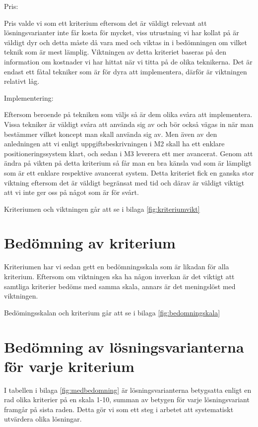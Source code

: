 \documentclass[11pt, a4paper]{report}
\begin{document}
Pris:

Pris valde vi som ett kriterium eftersom det är väldigt relevant att lösningsvarianter inte får kosta för mycket, viss utrustning vi har kollat på är väldigt dyr och detta måste då vara med och viktas in i bedömningen om vilket teknik som är mest lämplig. Viktningen av detta kriteriet baseras på den information om kostnader vi har hittat när vi titta på de olika teknikerna. Det är endast ett fåtal tekniker som är för dyra att implementera, därför är viktningen relativt låg.



Implementering:

Eftersom beroende på tekniken som väljs så är dem olika svåra att implementera. Vissa tekniker är väldigt svåra att använda sig av och bör också vägas in när man bestämmer vilket koncept man skall använda sig av. Men även av den anledningen att vi enligt uppgiftsbeskrivningen i M2 skall ha ett enklare positioneringssystem klart, och sedan i M3 leverera ett mer avancerat. Genom att ändra på vikten på detta kriterium så får man en bra känsla vad som är lämpligt som är ett enklare respektive avancerat system. Detta kriteriet fick en ganska stor viktning eftersom det är väldigt begränsat med tid och därav är väldigt viktigt att vi inte ger oss på något som är för svårt.

Kriteriumen och viktningen går att se i bilaga \ref{fig:kriteriumvikt}


\section{Bedömning av kriterium}

Kriteriumen har vi sedan gett en bedömningsskala som är likadan för alla kriterium. Eftersom om viktningen ska ha någon inverkan är det viktigt att samtliga kriterier bedöms med samma skala, annars är det meningslöst med viktningen.

Bedömingsskalan och kriterium går att se i bilaga \ref{fig:bedomningskala}

\section{Bedömning av lösningsvarianterna för varje kriterium}

I tabellen i bilaga \ref{fig:medbedomning} är lösningsvarianterna betygsatta enligt en rad olika kriterier på en skala 1-10, summan av betygen för varje lösningsvariant framgår på sista raden. Detta gör vi som ett steg i arbetet att systematiskt utvärdera olika lösningar.
\end{document}
